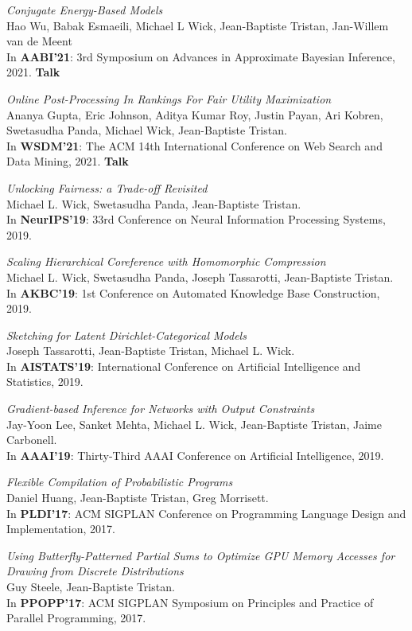 \documentclass[margin,line]{res}
\begin{document}
\begin{resume}
\emph{Conjugate Energy-Based Models}\\
Hao Wu, Babak Esmaeili, Michael L Wick, Jean-Baptiste Tristan, Jan-Willem van de Meent\\
In {\bf AABI'21}: 3rd Symposium on
Advances in Approximate Bayesian Inference, 2021. {\bf Talk}

\emph{Online Post-Processing In Rankings For Fair Utility Maximization}\\
Ananya Gupta, Eric Johnson, Aditya Kumar Roy, Justin Payan, Ari Kobren, Swetasudha Panda, Michael Wick, Jean-Baptiste Tristan.\\
In {\bf WSDM'21}: The ACM 14th International Conference on Web Search and Data Mining, 2021. {\bf Talk}

\emph{Unlocking Fairness: a Trade-off Revisited}\\
Michael L. Wick, Swetasudha Panda, Jean-Baptiste Tristan.\\
In {\bf NeurIPS'19}: 33rd Conference on Neural Information Processing Systems, 2019.

\emph{Scaling Hierarchical Coreference with Homomorphic Compression}\\
Michael L. Wick, Swetasudha Panda, Joseph Tassarotti, Jean-Baptiste Tristan.\\
In {\bf AKBC'19}: 1st Conference on Automated Knowledge Base Construction, 2019.

\emph{Sketching for Latent Dirichlet-Categorical Models}\\
Joseph Tassarotti, Jean-Baptiste Tristan, Michael L. Wick.\\
In {\bf AISTATS'19}: International Conference on 
Artificial Intelligence and Statistics, 2019.

\emph{Gradient-based Inference for Networks with Output Constraints}\\
Jay-Yoon Lee, Sanket Mehta, Michael L. Wick, Jean-Baptiste Tristan, Jaime Carbonell.\\
In {\bf AAAI'19}: Thirty-Third AAAI Conference on Artificial Intelligence, 2019.

\emph{Flexible Compilation of Probabilistic Programs}\\
Daniel Huang, Jean-Baptiste Tristan, Greg Morrisett.\\
In {\bf PLDI'17}: ACM SIGPLAN Conference on Programming
Language Design and Implementation, 2017.

\emph{Using Butterfly-Patterned Partial Sums to Optimize GPU Memory Accesses for Drawing from Discrete Distributions}\\
Guy Steele, Jean-Baptiste Tristan.\\
In {\bf PPOPP'17}: ACM SIGPLAN Symposium on
Principles and Practice of Parallel Programming, 2017. 


\end{resume}
\end{document}
